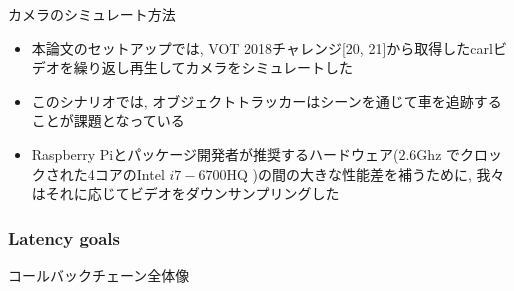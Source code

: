 \begin{frame}{カメラのシミュレート方法}
    \begin{itemize}
        \item 本論文のセットアップでは, VOT 2018チャレンジ[20, 21]から取得したcarlビデオを繰り返し再生してカメラをシミュレートした
        \item このシナリオでは, オブジェクトトラッカーはシーンを通じて車を追跡することが課題となっている
        \item Raspberry Piとパッケージ開発者が推奨するハードウェア($2.6 \mathrm{Ghz}$ でクロックされた4コアのIntel $i 7-6700 \mathrm{HQ}$ )の間の大きな性能差を補うために, 我々はそれに応じてビデオをダウンサンプリングした
    \end{itemize}
\end{frame}


\subsubsection{Latency goals}
\label{sssec: latency goals}

\begin{frame}{コールバックチェーン全体像}
\end{frame}



